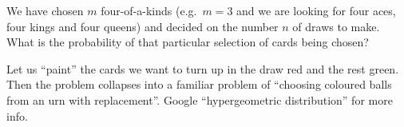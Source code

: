 \documentclass[6pt]{article}
\begin{document}
\clearpage
\begin{tcolorbox}[title=\text{Hypergeometric \ding{173}}]
We have chosen $m$ four-of-a-kinds (e.g.\ $m=3$ and we are looking for four aces, four kings and four queens) and decided on the number $n$ of draws to make. What is the probability of that particular selection of cards being chosen?

Let us ``paint'' the cards we want to turn up in the draw red and the rest green. Then the problem collapses into a familiar problem of ``choosing coloured balls from an urn with replacement''. Google ``hypergeometric distribution'' for more info.
\end{tcolorbox}
\end{document}
